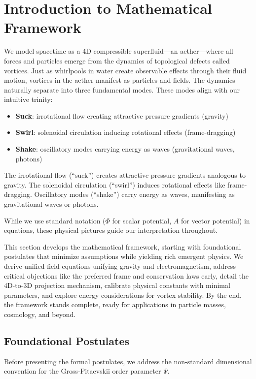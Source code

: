 \section{Introduction to Mathematical Framework}

We model spacetime as a 4D compressible superfluid---an aether---where all forces and particles emerge from the dynamics of topological defects called vortices. Just as whirlpools in water create observable effects through their fluid motion, vortices in the aether manifest as particles and fields. The dynamics naturally separate into three fundamental modes. These modes align with our intuitive trinity:
\begin{itemize}
\item \textbf{Suck}: irrotational flow creating attractive pressure gradients (gravity)
\item \textbf{Swirl}: solenoidal circulation inducing rotational effects (frame-dragging)
\item \textbf{Shake}: oscillatory modes carrying energy as waves (gravitational waves, photons)
\end{itemize}
The irrotational flow (``suck'') creates attractive pressure gradients analogous to gravity. The solenoidal circulation (``swirl'') induces rotational effects like frame-dragging. Oscillatory modes (``shake'') carry energy as waves, manifesting as gravitational waves or photons.

While we use standard notation ($\Phi$ for scalar potential, $A$ for vector potential) in equations, these physical pictures guide our interpretation throughout.

This section develops the mathematical framework, starting with foundational postulates that minimize assumptions while yielding rich emergent physics. We derive unified field equations unifying gravity and electromagnetism, address critical objections like the preferred frame and conservation laws early, detail the 4D-to-3D projection mechanism, calibrate physical constants with minimal parameters, and explore energy considerations for vortex stability. By the end, the framework stands complete, ready for applications in particle masses, cosmology, and beyond.

\subsection{Foundational Postulates}

Before presenting the formal postulates, we address the non-standard dimensional convention for the Gross-Pitaevskii order parameter $\Psi$.

